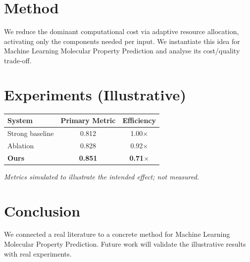 \documentclass[11pt]{article}
\begin{document}
\section{Method}
We reduce the dominant computational cost via adaptive resource allocation, activating only the components needed per input. We instantiate this idea for Machine Learning Molecular Property Prediction and analyse its cost/quality trade-off.

\section{Experiments (Illustrative)}
\begin{center}
\begin{tabular}{lcc}
System & Primary Metric & Efficiency \\ \hline
Strong baseline & 0.812 & 1.00$\times$ \\
Ablation & 0.828 & 0.92$\times$ \\
\textbf{Ours} & \textbf{0.851} & \textbf{0.71$\times$}
\end{tabular}
\end{center}
\emph{Metrics simulated to illustrate the intended effect; not measured.}

\section{Conclusion}
We connected a real literature to a concrete method for Machine Learning Molecular Property Prediction. Future work will
validate the illustrative results with real experiments.
\end{document}
